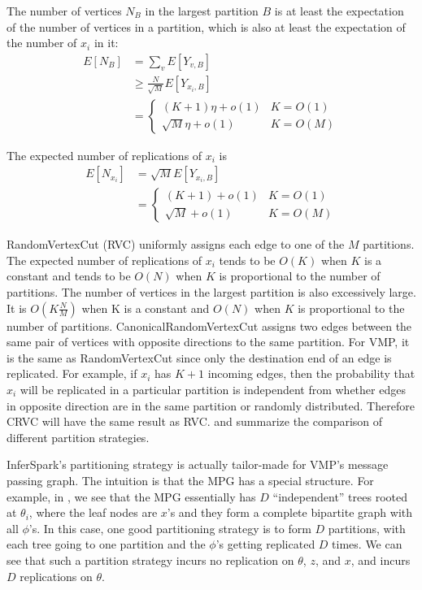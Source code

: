 The number of vertices $N_B$ in the largest partition $B$ is at least the expectation
of the number of vertices in a partition, which is also at least the
expectation of the number of $x_i$ in it:
\begin{align*}
	E[N_{B}] &= \sum_{v} E[Y_{v, B}] \\
		&\ge \frac{N}{\sqrt{M}} E[Y_{x_i, B}]	\\
		& = \left\{
				\begin{array}{ll}
					(K + 1)\eta	+ o(1) & K = O(1) \\
					\sqrt{M}\eta + o(1) & K = O(M) 
				\end{array}
			\right.%
\end{align*}

The expected number of replications of $x_i$ is
\begin{align*}
	E[N_{x_i}] &= \sqrt{M}E[Y_{x_i, B}] \\
		&= \left\{
			\begin{array}{ll}
				(K + 1) + o(1) & K = O(1) \\
				\sqrt{M} + o(1) & K = O(M) 
			\end{array}
		\right.%
\end{align*}


%
RandomVertexCut (RVC) uniformly assigns each edge to one of the $M$
partitions. The expected number of replications of $x_i$ tends to be $O(K)$
when $K$ is a constant and tends to be $O(N)$ when $K$ is proportional to the
number of partitions. The number of vertices in the largest partition is also
excessively large. It is $O(K\frac{N}{M})$ when K is a constant and $O(N)$
when $K$ is proportional to the number of partitions.  CanonicalRandomVertexCut
assigns two edges between the same pair of vertices with opposite directions
to the same partition. For VMP, it is the same as RandomVertexCut since only
the destination end of an edge is replicated. For example, if $x_i$ has $K +1$
incoming edges, then the probability that $x_i$ will be replicated in a
particular partition is independent from whether edges in opposite
direction are in the same partition or randomly distributed. Therefore 
CRVC will have the same result as RVC.  
 and
 summarize the comparison of different
partition strategies.

InferSpark's partitioning strategy is actually tailor-made for VMP's message passing graph.
The intuition is that the MPG has a special structure.
For example, in ,
we see that the MPG essentially has $D$ ``independent'' trees rooted at $\theta_i$,
where the leaf nodes  are $x$'s and they form a complete bipartite graph with all $\phi$'s.
In this case, one good partitioning strategy is to form $D$ partitions, 
with each tree going to one partition and the $\phi$'s getting replicated $D$ times.
We can see that such a partition strategy incurs no replication on $\theta$, $z$, and $x$,
and incurs $D$ replications on $\theta$.

